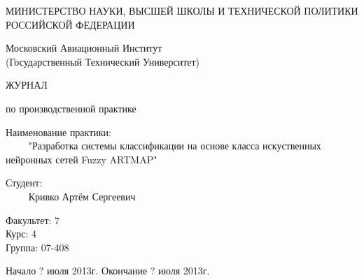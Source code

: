 \begin{titlepage}
\newpage

\begin{center}
	МИНИСТЕРСТВО НАУКИ, ВЫСШЕЙ ШКОЛЫ И ТЕХНИЧЕСКОЙ ПОЛИТИКИ \\
	РОССИЙСКОЙ ФЕДЕРАЦИИ
\end{center}


\begin{center}
	Московский Авиационный Институт\\
	(Государственный Технический Университет)
\end{center}

\vspace{2em}

ЖУРНАЛ

по производственной практике

\vspace{2em}



\begin{flushleft}
	Наименование практики: \\
	$\qquad$ "Разработка системы классификации на основе класса искуственных нейронных сетей Fuzzy ARTMAP"
\end{flushleft}

\begin{flushleft}
	Студент: \\
	$\qquad$ Кривко Артём Сергеевич
\end{flushleft}

\begin{flushleft}
	Факультет: 7 \\
	Курс: 4 \\
	Группа: 07-408 
\end{flushleft}


\vspace{6em}

\begin{center}
Начало ? июля 2013г.
Окончание ? июля 2013г.
\end{center}

\vspace{\fill}


\end{titlepage}
